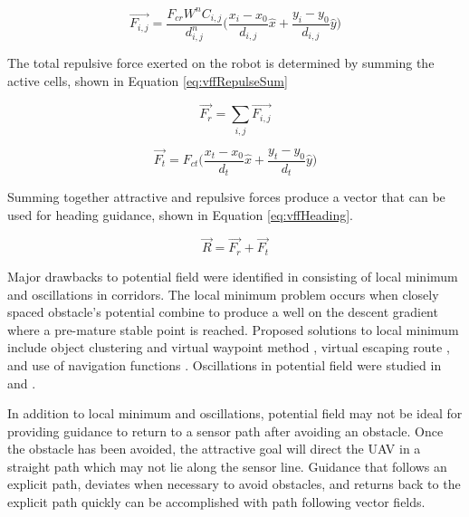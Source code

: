 \documentclass[conf]{new-aiaa}
\begin{document}
\begin{equation}\label{eq:vffRepulse}
\overrightarrow{F_{i,j}} = \frac{F_{cr}W^nC_{i,j}}{d^n_{i,j}} \bigg( \frac{x_i-x_0}{d_{i,j}}\hat{x} + \frac{y_i-y_0}{d_{i,j}}\hat{y}\bigg)
\end{equation}

The total repulsive force exerted on the robot is determined by summing the active cells, shown in Equation \ref{eq:vffRepulseSum}


\begin{equation}\label{eq:vffRepulseSum}
\overrightarrow{F_r} = \sum_{i,j}\overrightarrow{F_{i,j}}
\end{equation}


\begin{equation}\label{eq:vffGoal}
\overrightarrow{F_t} = F_{ct} \bigg( \frac{x_t-x_0}{d_{t}}\hat{x} + \frac{y_t-y_0}{d_{t}}\hat{y}\bigg)
\end{equation}

Summing together attractive and repulsive forces produce a vector that can be used for heading guidance, shown in Equation \ref{eq:vffHeading}.

\begin{equation}\label{eq:vffHeading}
\overrightarrow{R} = \overrightarrow{F_r} + \overrightarrow{F_t}
\end{equation}

 Major drawbacks to potential field were identified in \cite{koren_potential_1991} consisting of local minimum and oscillations in corridors. The local minimum problem occurs when closely spaced obstacle's potential combine to produce a well on the descent gradient where a pre-mature stable point is reached. Proposed solutions to local minimum include object clustering and virtual waypoint method \cite{liu_virtual-waypoint_2016}, virtual escaping route \cite{kim_escaping_2009}, and use of navigation functions \cite{goerzen_survey_2010}. Oscillations in potential field were studied in \cite{lei_tang_novel_2010} and \cite{li_efficient_2012}.


In addition to local minimum and oscillations, potential field may not be ideal for providing guidance to return to a sensor path after avoiding an obstacle. Once the obstacle has been avoided, the attractive goal will direct the UAV in a straight path which may not lie along the sensor line. Guidance that follows an explicit path, deviates when necessary to avoid obstacles, and returns back to the explicit path quickly can be accomplished with path following vector fields. 
\end{document}
